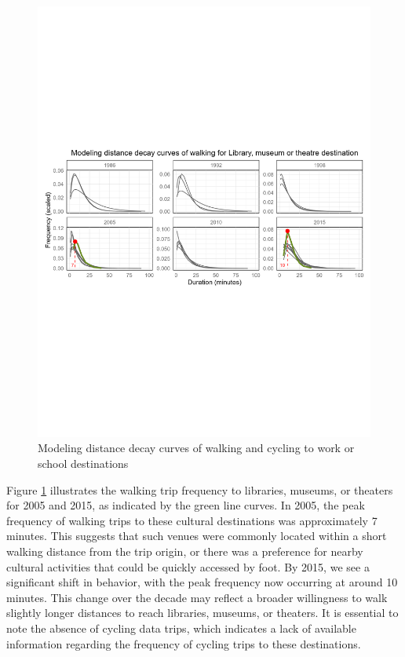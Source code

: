 \documentclass[
11pt, %
oneside, %
english, %
singlespacing, %
]{macthesis} %
\begin{document}
\begin{figure}
\includegraphics[width=1\linewidth]{figure/ch03_fig_10} \caption{Modeling distance decay curves of walking and cycling to work or school destinations}\label{fig:ch03-plot-fig-10}
\end{figure}

Figure \ref{fig:ch03-plot-fig-10} illustrates the walking trip frequency to libraries, museums, or theaters for 2005 and 2015, as indicated by the green line curves. In 2005, the peak frequency of walking trips to these cultural destinations was approximately 7 minutes. This suggests that such venues were commonly located within a short walking distance from the trip origin, or there was a preference for nearby cultural activities that could be quickly accessed by foot. By 2015, we see a significant shift in behavior, with the peak frequency now occurring at around 10 minutes. This change over the decade may reflect a broader willingness to walk slightly longer distances to reach libraries, museums, or theaters. It is essential to note the absence of cycling data trips, which indicates a lack of available information regarding the frequency of cycling trips to these destinations.
\end{document}
